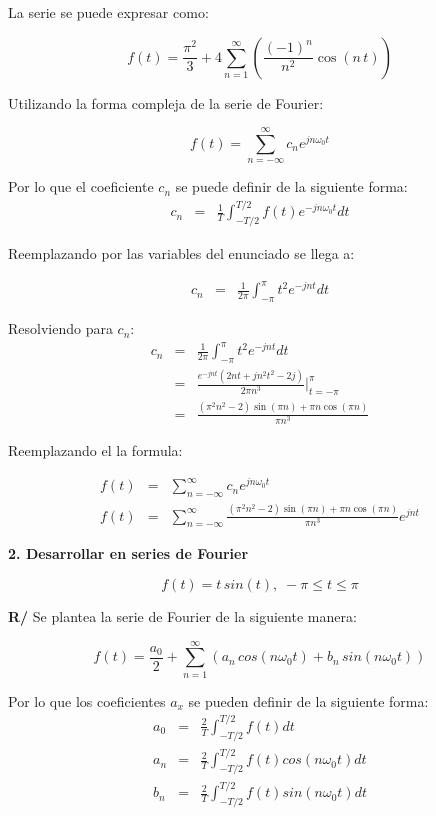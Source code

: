 \documentclass[a4paper]{article}
\begin{document}
La serie se puede expresar como:

$$f(t) = \frac{\pi^2}{3} + 4 \sum_{n=1}^\infty\left(\frac{(-1)^n}{n^2}\cos{(n\,t)}\right)$$

Utilizando la forma compleja de la serie de Fourier:

$$f(t) =  \sum_{n=-\infty}^\infty c_n e^{jn\omega_0t} $$

Por lo que el coeficiente $c_n$ se puede definir de la siguiente forma:
\begin{eqnarray*}
c_n &=& \frac{1}{T}\int_{-T/2}^{T/2}f(t)e^{-jn\omega_0t}dt
\end{eqnarray*}

Reemplazando por las variables del enunciado se llega a:

\begin{eqnarray*}
c_n &=& \frac{1}{2\pi}\int_{-\pi}^{\pi}t^2e^{-jnt}dt
\end{eqnarray*}

Resolviendo para $c_n$:
\begin{eqnarray*}
c_n &=& \frac{1}{2\pi}\int_{-\pi}^{\pi}t^2e^{-jnt}dt\\
&=& \frac{e^{-jnt}(2nt+jn^2t^2-2j)}{2\pi n^3}\bigg|_{t=-\pi}^{\pi}\\
&=& \frac{(\pi^2n^2-2)\sin(\pi n) + \pi n\cos(\pi n)}{\pi n^3}
\end{eqnarray*}

Reemplazando el la formula:

\begin{eqnarray*}
f(t) &=&  \sum_{n=-\infty}^\infty c_n e^{jn\omega_0t} \\
f(t) &=&  \sum_{n=-\infty}^\infty \frac{(\pi^2n^2-2)\sin(\pi n) + \pi n\cos(\pi n)}{\pi n^3} e^{jnt}
\end{eqnarray*}

\textbf{2. Desarrollar en series de Fourier}

$$f(t) = t \, sin(t),\; -\pi \leq t \leq \pi$$


\textbf{R/} Se plantea la serie de Fourier de la siguiente manera:

$$f(t) = \frac{a_0}{2} + \sum_{n=1}^\infty\left(a_n\,cos(n\omega_0t) + b_n\,sin(n\omega_0t)\right)$$

Por lo que los coeficientes $a_x$ se pueden definir de la siguiente forma:
\begin{eqnarray*}
a_0 &=& \frac{2}{T}\int_{-T/2}^{T/2}f(t)dt\\
a_n &=& \frac{2}{T}\int_{-T/2}^{T/2}f(t)cos(n\omega_0t)dt\\
b_n &=& \frac{2}{T}\int_{-T/2}^{T/2}f(t)sin(n\omega_0t)dt
\end{eqnarray*}
\end{document}
